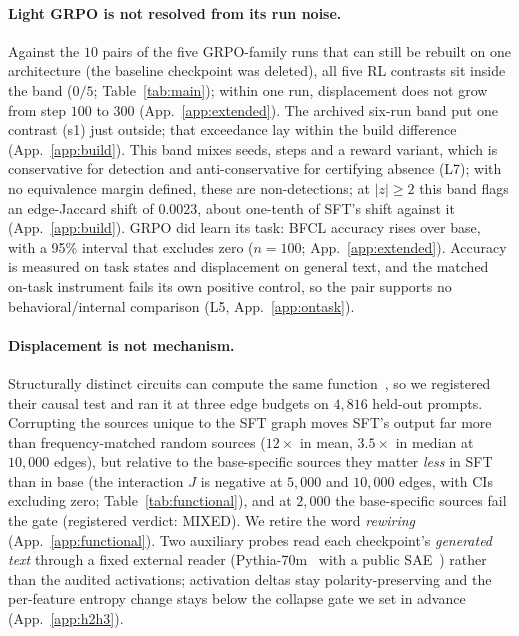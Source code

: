 \documentclass{article}
\begin{document}
\paragraph{Light GRPO is not resolved from its run noise.} Against the $10$ pairs of the five GRPO-family runs that can still be rebuilt on one architecture (the baseline checkpoint was deleted), all five RL contrasts sit inside the band ($0/5$; Table~\ref{tab:main}); within one run, displacement does not grow from step $100$ to $300$ (App.~\ref{app:extended}). The archived six-run band put one contrast (s1) just outside; that exceedance lay within the build difference (App.~\ref{app:build}). This band mixes seeds, steps and a reward variant, which is conservative for detection and anti-conservative for certifying absence (L7); with no equivalence margin defined, these are non-detections; at $|z|\ge2$ this band flags an edge-Jaccard shift of $0.0023$, about one-tenth of SFT's shift against it (App.~\ref{app:build}). GRPO did learn its task: BFCL accuracy rises over base, with a 95\% interval that excludes zero ($n{=}100$; App.~\ref{app:extended}). Accuracy is measured on task states and displacement on general text, and the matched on-task instrument fails its own positive control, so the pair supports no behavioral/internal comparison (L5, App.~\ref{app:ontask}).

\paragraph{Displacement is not mechanism.} Structurally distinct circuits can compute the same function~\citep{bayatmakou2026manycircuits}, so we registered their causal test and ran it at three edge budgets on $4{,}816$ held-out prompts. Corrupting the sources unique to the SFT graph moves SFT's output far more than frequency-matched random sources ($12\times$ in mean, $3.5\times$ in median at $10{,}000$ edges), but relative to the base-specific sources they matter \emph{less} in SFT than in base (the interaction $J$ is negative at $5{,}000$ and $10{,}000$ edges, with CIs excluding zero; Table~\ref{tab:functional}), and at $2{,}000$ the base-specific sources fail the gate (registered verdict: MIXED). We retire the word \emph{rewiring} (App.~\ref{app:functional}). Two auxiliary probes read each checkpoint's \emph{generated text} through a fixed external reader (Pythia-70m~\citep{biderman2023pythia} with a public SAE~\citep{marks2024sparse_circuits}) rather than the audited activations; activation deltas stay polarity-preserving and the per-feature entropy change stays below the collapse gate we set in advance (App.~\ref{app:h2h3}).
\label{sec:results-h2}
\label{sec:results-h3}
\end{document}
